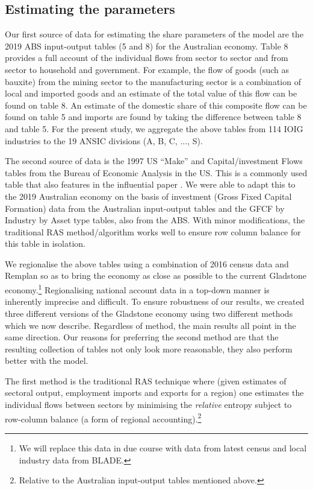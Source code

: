\documentclass[12pt,a4paper]{article}
\begin{document}
\subsection*{Estimating the parameters} Our first source of data for estimating
the share parameters of the model are the 2019 ABS input-output
tables (5 and 8) for the Australian economy. Table 8 provides a full account of
the individual flows from sector to sector and from sector to household and
government.  For example, the flow of goods (such as bauxite) from the mining
sector to the manufacturing sector is a combination of local and imported goods
and an estimate of the total value of this flow can be found on table 8.  An
estimate of the domestic share of this composite flow can be found on table 5
and imports are found by taking the difference between table 8 and table 5.
For the present study, we aggregate the above tables from 114 IOIG industries
to the 19 ANSIC divisions (A, B, C, ..., S). 

The second source of data is the 1997 US “Make” and Capital/investment Flows
tables from the Bureau of Economic Analysis in the US. This is a commonly used
table that also features in the influential paper \cite{Atalay}.
We were able to adapt this to the 2019 Australian economy on the basis of
investment (Gross Fixed Capital Formation) data from the Australian
input-output tables and the GFCF by Industry by Asset type tables, also from
the ABS. With minor modifications, the traditional RAS method/algorithm works
well to ensure row column balance for this table in isolation.

We regionalise the above tables using a combination of 2016 census data and
Remplan so as to bring the economy as close as possible to the current
Gladstone economy.\footnote{We will replace this data in due course with data
from latest census and local industry data from BLADE.} Regionalising national
account data in a top-down manner is inherently imprecise and difficult. To
ensure robustness of our results, we created three different versions of the
Gladstone economy using two different methods which we now describe.
Regardless of method, the main results all point in the same direction. Our
reasons for preferring the second method are that the resulting collection of
tables not only look more reasonable, they also perform better with the
model.

The first method is the traditional RAS technique where (given estimates of
sectoral output, employment imports and exports for a region) one estimates the
individual flows between sectors by minimising the \emph{relative} entropy
subject to row-column balance (a form of regional accounting).\footnote{
  Relative to the Australian input-output tables mentioned above.  }
\end{document}
